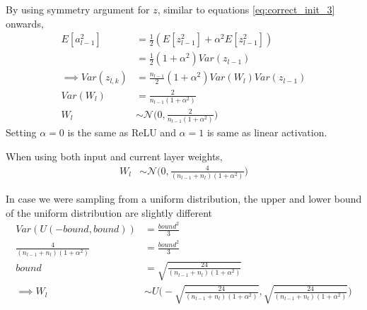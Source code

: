 \documentclass[../../deep_learning_notes.tex]{subfiles}
\begin{document}
By using symmetry argument for $z$, similar to equations \eqref{eq:correct_init_3} onwards,
\begin{align*}
    E[a_{l-1}^{2}] &= \frac{1}{2}(E[z_{l-1}^{2}]  + \alpha^{2} E[z_{l-1}^{2}])\\
    &= \frac{1}{2}(1 + \alpha^{2})Var(z_{l-1})\\
    \implies Var(z_{l, k}) &= \frac{n_{l-1}}{2}(1 + \alpha^{2})Var(W_{l})Var(z_{l-1})\\
    Var(W_{l}) &= \frac{2}{n_{l-1}(1 + \alpha^{2})} \\
    W_{l} &\sim \mathcal{N}\bigg(0, \frac{2}{n_{l-1}(1 + \alpha^{2})}\bigg)
\end{align*}
Setting $\alpha = 0$ is the same as ReLU and $\alpha = 1$ is same as linear activation.\newline

When using both input and current layer weights,
\begin{align*}
    W_{l} &\sim \mathcal{N}\bigg(0, \frac{4}{(n_{l-1} + n_{l})(1 + \alpha^{2})}\bigg)
\end{align*}

In case we were sampling from a uniform distribution, the upper and lower bound of the uniform distribution are slightly different
\begin{align*}
    Var(U(-bound, bound)) &= \frac{bound^{2}}{3}\\
    \frac{4}{(n_{l-1} + n_{l})(1 + \alpha^{2})} &= \frac{bound^{2}}{3}\\
    bound &= \sqrt{\frac{24}{(n_{l-1} + n_{l})(1+ \alpha^{2})}}\\
    \implies W_{l} &\sim U\bigg(-\sqrt{\frac{24}{(n_{l-1} + n_{l})(1+ \alpha^{2})}}, \sqrt{\frac{24}{(n_{l-1} + n_{l})(1+ \alpha^{2})}}\bigg)
\end{align*}


\end{document}
